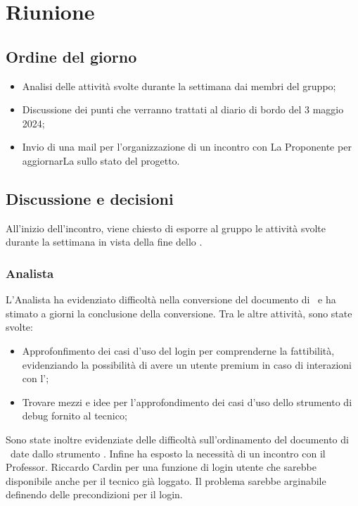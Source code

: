 \section{Riunione}
\subsection{Ordine del giorno}
\begin{itemize}
	\item Analisi delle attività svolte durante la settimana dai membri del gruppo;
	\item Discussione dei punti che verranno trattati al diario di bordo del 3 maggio 2024;
	\item Invio di una mail per l'organizzazione di un incontro con La Proponente per aggiornarLa sullo stato del progetto.
\end{itemize}

\subsection{Discussione e decisioni}
\par All'inizio dell'incontro, viene chiesto di esporre al gruppo le attività svolte durante la settimana in vista della fine dello .
\subsubsection{Analista}
\par L'Analista ha evidenziato difficoltà nella conversione del documento di \AdR\ e ha stimato a giorni la conclusione della conversione. Tra le altre attività, sono state svolte:
\begin{itemize}
	\item Approfonfimento dei casi d'uso del login per comprenderne la fattibilità, evidenziando la possibilità di avere un utente premium in caso di interazioni con l';
	\item Trovare mezzi e idee per l'approfondimento dei casi d'uso dello strumento di debug fornito al tecnico;
\end{itemize}
\par Sono state inoltre evidenziate delle difficoltà sull'ordinamento del documento di \AdR\ date dallo strumento . Infine ha esposto la necessità di un incontro con il Professor. Riccardo Cardin per una funzione di login utente che sarebbe disponibile anche per il tecnico già loggato. Il problema sarebbe arginabile definendo delle precondizioni per il login. 
